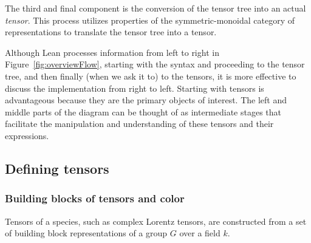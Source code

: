 \documentclass[a4paper, 11pt]{article}
\begin{document}
The third and final component is the conversion of the tensor tree into an actual \emph{tensor}. 
This process utilizes properties of the symmetric-monoidal category of representations
 to translate the tensor tree into a tensor.

Although Lean processes information from left to right in Figure~\ref{fig:overviewFlow}, 
starting with the syntax and proceeding to the tensor tree, and then finally (when 
we ask it to) to the tensors, 
it is more effective to discuss the implementation from right to left. 
Starting with tensors is advantageous because they are the primary objects of interest.
 The left and middle parts of the diagram can be thought of as intermediate stages that facilitate the 
 manipulation and understanding of these tensors and their expressions.

\subsection{Defining tensors} \label{sec:definingTensors}

\subsubsection{Building blocks of tensors and color} \label{sec:buildingBlocks}

Tensors of a species, such as complex Lorentz tensors, are constructed from a 
set of building block representations of a group $G$ over a field $k$.
\end{document}
